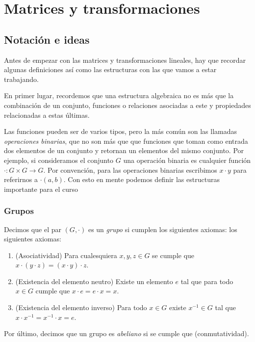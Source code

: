 \chapter{Matrices y transformaciones}

\section{Notación e ideas}

Antes de empezar con las matrices y transformaciones lineales, hay que recordar algunas definiciones así como las estructuras con las que vamos a estar trabajando.

En primer lugar, recordemos que una estructura algebraica no es más que la combinación de un conjunto, funciones o relaciones asociadas a este y propiedades relacionadas a estas últimas.

Las funciones pueden ser de varios tipos, pero la más común son las llamadas \emph{operaciones binarias}, que no son más que que funciones que toman como entrada dos elementos de un conjunto y retornan un elementos del mismo conjunto. Por ejemplo, si consideramos el conjunto $G$ una operación binaria es cualquier función $\cdot \colon  G \times G \to G$. Por convención, para las operaciones binarias escribimos $x \cdot y$  para referirnos a $\cdot(a,b)$. Con esto en mente podemos definir las estructuras importante para el curso

\subsection{Grupos}

\begin{defi}
  Decimos que el par $(G, \cdot)$ es un \emph{grupo} si cumplen los siguientes axiomas:
  los siguientes axiomas:
  \begin{enumerate}
    \item (Asociatividad) Para cualesquiera $x, y, z \in G$ se cumple que $x\cdot(y\cdot z) = (x\cdot y)\cdot z$.
    \item (Existencia del elemento neutro) Existe un elemento $e$ tal que para todo $x \in G$ cumple que $x\cdot e = e\cdot x = x$.
    \item (Existencia del elemento inverso) Para todo $x \in G$ existe $x^{-1} \in G$ tal que $x\cdot x^{-1} = x^{-1}\cdot x = e$.
  \end{enumerate}

  Por último, decimos que un grupo es \emph{abeliano} si  se cumple que  (conmutatividad).
\end{defi}

